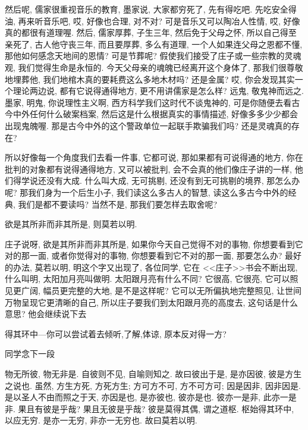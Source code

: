 \documentclass[11pt]{article}
\begin{document}
然后呢, 儒家很重视音乐的教育, 墨家说, 大家都穷死了, 先有得吃吧. 先吃安全得油, 再来听音乐吧, 哎, 好像也合理, 对不对? 可是音乐又可以陶冶人性情, 哎, 好像真的都很有道理喔. 然后, 儒家厚葬, 子生三年, 然后免于父母之怀, 所以自己得至亲死了, 古人他守丧三年, 而且要厚葬, 多么有道理, 一个人如果连父母之恩都不懂, 那他如何感念天地间的恩情? 可是节葬呢? 假使我们接受了庄子或一些宗教的灵魂观, 我们觉得生命是永恒的. 今天父母亲的魂魄已经离开这个身体了, 那我们很尊敬地埋葬他, 我们地棺木真的要耗费这么多地木材吗? 还是金属? 哎, 你会发现其实一个理论两边说, 都有它说得通得地方, 更不用讲儒家是怎么样? 远鬼, 敬鬼神而远之. 墨家, 明鬼, 你说理性主义啊, 西方科学我们这时代不谈鬼神的, 可是你随便去看古今中外任何什么破案档案, 然后这是什么根据真实的事情描述, 好像多多少少都会出现鬼魄喔. 那是古今中外的这个警政单位一起联手欺骗我们吗? 还是灵魂真的存在? 

所以好像每一个角度我们去看一件事, 它都可说, 那如果都有可说得通的地方, 你在批判的对象都有说得通得地方, 又可以被批判, 会不会真的他们像庄子讲的一样, 他们得学说还没有大成. 什么叫大成, 无可挑剔, 还没有到无可挑剔的境界, 那怎么办呢? 那我们身为一个后生小子, 我们读这么多古人的智慧, 读这么多古今中外的经典, 我们是都不要读吗? 当然不是, 那我们要怎样去取舍呢?

{\begin{center}
		{\color{green} 欲是其所非而非其所是, 则莫若以明.}
\end{center}}

\vspace{-0.5cm}

庄子说呀, {\color{blue} 欲是其所非而非其所是}, 如果你今天自己觉得不对的事物, 你想要看到它对的那一面, 或者你觉得对的事物, 你想要看到它不对的那一面, 那要怎么办? 最好的办法, {\color{blue} 莫若以明}, 明这个字又出现了, 各位同学, 它在 <<庄子>>书会不断出现, 什么叫明, 太阳加月亮叫做明. 太阳跟月亮有什么不同? 它很高, 它很亮, 它可以照见更广阔, 幅员更完整的大地, 是不是这样呢? 它可以无所偏执地完整照见, 让世间万物呈现它更清晰的自己, 所以庄子要我们到太阳跟月亮的高度去, 这句话是什么意思? 他会继续说下去

{\Large {\color{purple} 得其环中---你可以尝试着去倾听,了解,体谅, 原本反对得一方?}}

同学念下一段

{\color{blue} 物无所彼, 物无非是. 自彼则不见, 自喻则知之. 故曰彼出于是, 是亦因彼, 彼是方生之说也. 虽然, 方生方死, 方死方生; 方可方不可, 方不可方可; 因是因非, 因非因是.是以圣人不由而照之于天, 亦因是也, 是亦彼也, 彼亦是也. 彼亦一是非, 此亦一是非. 果且有彼是乎哉? 果且无彼是乎哉? 彼是莫得其偶, 谓之道枢. 枢始得其环中, 以应无穷. 是亦一无穷, 非亦一无穷也. 故曰莫若以明.}
\end{document}
